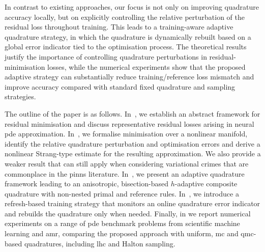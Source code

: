 \documentclass[oneside,reqno,11pt,a4paper]{amsart}
\theoremstyle{definition}
\begin{document}
In contrast to existing approaches, our focus is not only on improving quadrature accuracy locally, but on explicitly controlling the relative perturbation of the residual loss throughout training. This leads to a training-aware adaptive quadrature strategy, in which the quadrature is dynamically rebuilt based on a global error indicator tied to the optimisation process. The theoretical results justify the importance of controlling quadrature perturbations in residual-minimisation losses, while the numerical experiments show that the proposed adaptive strategy can substantially reduce training/reference loss mismatch and improve accuracy compared with standard fixed quadrature and sampling strategies.

The outline of the paper is as follows. 
In~, we establish an abstract framework
for residual minimisation and discuss representative residual losses arising in
neural \ac{pde} approximation. In~, we
formalise minimisation over a nonlinear manifold, identify the relative
quadrature perturbation and optimisation errors and derive a nonlinear
Strang-type estimate for the resulting approximation. 
We also provide a weaker result that can still apply when considering variational crimes that are commonplace in the \acp{pinn} literature. 
In~, we present an adaptive quadrature framework leading
to an anisotropic, bisection-based $h$-adaptive composite quadrature with
non-nested primal and reference rules. In~, we introduce
a refresh-based training strategy that monitors an online quadrature error
indicator and rebuilds the quadrature only when needed. Finally, in
 we report numerical experiments on a range of \ac{pde}
benchmark problems from scientific machine learning and \ac{amr}, comparing the proposed
approach with uniform, \ac{mc} and \ac{qmc}-based quadratures, including \ac{lhc}
and Halton sampling.




\providecommand{\bbR}{\mathbb{R}}
\providecommand{\bbN}{\mathbb{N}}
\providecommand{\bbZ}{\mathbb{Z}}
\providecommand{\bbQ}{\mathbb{Q}}
\providecommand{\bbC}{\mathbb{C}}

\DeclarePairedDelimiter{\ip}{\langle}{\rangle}
\DeclarePairedDelimiter{\Norm}{\lVert}{\rVert}
\DeclarePairedDelimiter{\tnorm}{\lvert\!\lvert\!\lvert}{\rvert\!\rvert\!\rvert}

\providecommand{\vecx}{\mathbf{x}}
\providecommand{\vecn}{\mathbf{n}}
\providecommand{\vtheta}{\pmb{\theta}}
\providecommand{\vbeta}{\pmb{\beta}}
\end{document}
